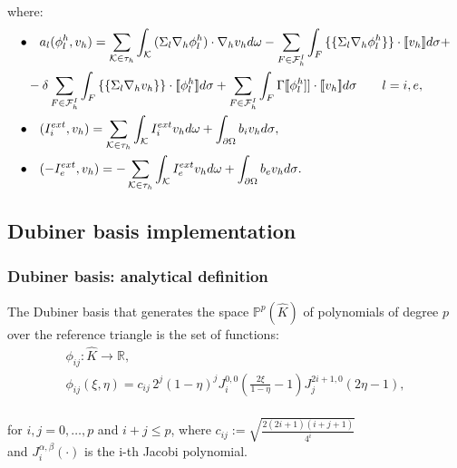 \documentclass[8pt]{beamer}
\begin{document}
\begin{frame}
	where:
	\center
	\begin{equation*}
	\begin{aligned}
	\bullet& \quad a_l(\phi_l^h,v_h)=\sum_{\mathcal{K} \in \tau_h} \int_{\mathcal{K}}{(\Sigma_l \nabla_h \phi_l^h) \cdot \nabla_h v_h d\omega}-\sum_{F \in \mathcal{F}_h^I} \int_F { \{\{\Sigma_l \nabla_h \phi_l^h \}\} \cdot [\![v_h]\!] d\sigma}+\\
	&-\delta \sum_{F \in \mathcal{F}_h^I} \int_F{ \{\{\Sigma_l \nabla_h v_h\}\} \cdot [\![\phi_l^h]\!]d\sigma}+\sum_{F \in \mathcal{F}_h^I}\int_F {\Gamma [\![\phi_l^h]] \cdot [\![v_h]\!] d\sigma} \qquad l=i,e,\\
	\newline
	\bullet& \quad (I_i^{ext},v_h)=\sum_{\mathcal{K} \in \tau_h} \int_{\mathcal{K}} {I_i^{ext} v_h d\omega}+\int_{\partial \Omega}{b_i v_h d\sigma},\\
	\newline
	\bullet& \quad (-I_e^{ext},v_h)=-\sum_{\mathcal{K} \in \tau_h} \int_{\mathcal{K}} {I_e^{ext} v_h d\omega}+\int_{\partial \Omega}{b_e v_h d\sigma}.
	\end{aligned}
	\end{equation*}
\end{frame}

\subsection{Dubiner basis implementation}

\begin{frame}
\frametitle{Dubiner basis: analytical definition}
\begin{definition} \label{dubiner}
	The Dubiner basis that generates the space $\mathbb{P}^p(\hat{K})$ of polynomials of degree $p$ over the reference triangle is the set of functions:
	\begin{equation*}
	\begin{gathered}
	 \phi_{ij}: \hat{K} \rightarrow \mathbb{R}, \\
	\phi_{ij}(\xi,\eta) =c_{ij} \, 2^j (1-\eta)^j J_i^{0,0}(\frac{2\xi}{1-\eta}-1) J_j^{2i+1,0} (2\eta-1),
	\end{gathered}
	\end{equation*}
	\vspace{2mm} \\
	\center
	for $i,j=0,\dots,p$ and $i+j \le p$, where $c_{ij} := \sqrt{\frac{2(2i+1)(i+j+1)}{4^i}}$ \\
	and $J_i^{\alpha,\beta}(\cdot)$ is the i-th Jacobi polynomial.
\end{definition}
\end{frame}
\end{document}
